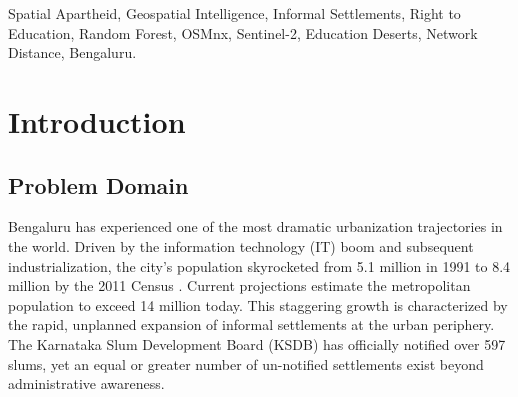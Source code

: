 \documentclass[conference]{IEEEtran}
\begin{document}
\begin{abstract}
As cities in India grow rapidly, millions of people end up living in informal settlements or slums. By law (the Right to Education Act), every child must have a government primary school within one kilometer of their home. However, because city planning maps are severely outdated, many of these informal settlements are invisible to the government. This research proposes a simple, AI-powered method to solve this problem. We use satellite imagery and artificial intelligence to map exactly where formal and informal settlements are in Bengaluru today. Then, we use road network data to calculate the actual walking distance from these neighborhoods to the nearest government school. 

Our initial baseline testing revealed that simple satellite color bands struggle to distinguish between concrete buildings in affluent areas and concrete/tin roofs in slums. We solved this by using texture algorithms to analyze the "chaos" of the physical layout. After successful classification, our geospatial analysis revealed a counter-intuitive paradigm: both formal and informal areas fail the government distance mandate, but formally planned, wealthy neighborhoods are actually located furthest away from state schools (averaging 1.60 km). Informal settlements are closer (1.43 km), but our WorldPop demographic integration revealed that these proximate schools are surrounded by immense population density. Wealthy areas adapt via a massive network of private schools and private buses (a Distance Penalty offset by wealth), while slum residents face severe overcrowding (a Density Penalty). Our framework provides an interactive dashboard blueprint for city planners to optimize new school placements based on both population density and budget constraints.
\end{abstract}

\begin{IEEEkeywords}
Spatial Apartheid, Geospatial Intelligence, Informal Settlements, Right to Education, Random Forest, OSMnx, Sentinel-2, Education Deserts, Network Distance, Bengaluru.
\end{IEEEkeywords}

\section{Introduction}
\subsection{Problem Domain}
Bengaluru has experienced one of the most dramatic urbanization trajectories in the world. Driven by the information technology (IT) boom and subsequent industrialization, the city's population skyrocketed from 5.1 million in 1991 to 8.4 million by the 2011 Census \cite{census2011}. Current projections estimate the metropolitan population to exceed 14 million today. This staggering growth is characterized by the rapid, unplanned expansion of informal settlements at the urban periphery. The Karnataka Slum Development Board (KSDB) has officially notified over 597 slums, yet an equal or greater number of un-notified settlements exist beyond administrative awareness.
\end{document}
